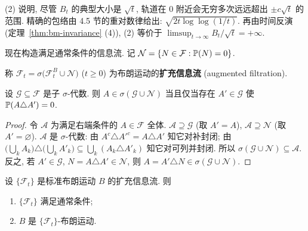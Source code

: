 (2) 说明, 尽管 $B_t$ 的典型大小是 $\sqrt{t}$, 轨道在 $0$ 附近会无穷多次远远超出 $\pm c\sqrt{t}$ 的范围. 精确的包络由 4.5 节的重对数律给出: $\sqrt{2t\log\log(1/t)}$. 再由时间反演 (定理~\ref{thm:bm-invariance} (4)), (2) 等价于 $\limsup_{t\to\infty}B_t/\sqrt{t}=+\infty$.

现在构造满足通常条件的信息流. 记 $\mathcal{N}=\{N\in\mathcal{F}:\P(N)=0\}$.

\begin{definition}[扩充信息流]\label{def:augmented}
称 $\mathcal{F}_t=\sigma\big(\mathcal{F}^B_t\cup\mathcal{N}\big)$ ($t\ge0$) 为布朗运动的\textbf{扩充信息流} (augmented filtration).
\end{definition}

\begin{lemma}\label{lem:null-augment}
设 $\mathcal{G}\subseteq\mathcal{F}$ 是子 $\sigma$-代数. 则 $A\in\sigma(\mathcal{G}\cup\mathcal{N})$ 当且仅当存在 $A'\in\mathcal{G}$ 使 $\P(A\triangle A')=0$.
\end{lemma}

\begin{proof}
令 $\mathcal{A}$ 为满足右端条件的 $A\in\mathcal{F}$ 全体. $\mathcal{A}\supseteq\mathcal{G}$ (取 $A'=A$), $\mathcal{A}\supseteq\mathcal{N}$ (取 $A'=\varnothing$). $\mathcal{A}$ 是 $\sigma$-代数: 由 $A^c\triangle A'^c=A\triangle A'$ 知它对补封闭; 由 $\big(\bigcup_kA_k\big)\triangle\big(\bigcup_kA'_k\big)\subseteq\bigcup_k(A_k\triangle A'_k)$ 知它对可列并封闭. 所以 $\sigma(\mathcal{G}\cup\mathcal{N})\subseteq\mathcal{A}$. 反之, 若 $A'\in\mathcal{G}$, $N=A\triangle A'\in\mathcal{N}$, 则 $A=A'\triangle N\in\sigma(\mathcal{G}\cup\mathcal{N})$.
\end{proof}

\begin{theorem}[扩充信息流满足通常条件]\label{thm:augmented}
设 $\{\mathcal{F}_t\}$ 是标准布朗运动 $B$ 的扩充信息流. 则
\begin{enumerate}
\item $\{\mathcal{F}_t\}$ 满足通常条件;
\item $B$ 是 $\{\mathcal{F}_t\}$-布朗运动.
\end{enumerate}
\end{theorem}

